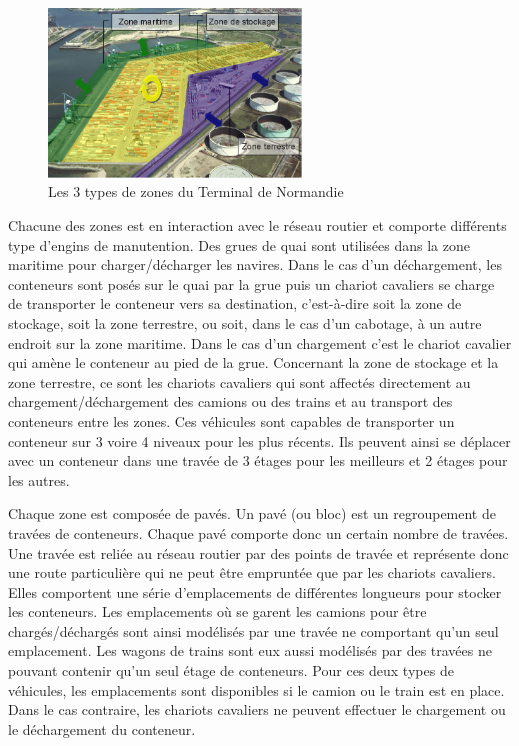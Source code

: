 \begin{figure}[h]
 \centering
 \includegraphics[width=0.6\textwidth]{chapitres/simulation/3zonesDuTN.png}
 \caption{Les 3 types de zones du Terminal de Normandie}
 \label{fig:simulation:3zones}
\end{figure}

Chacune des zones est en interaction avec le réseau routier et comporte différents type d'engins de manutention. Des grues de quai sont utilisées dans la zone maritime pour charger/décharger les navires. Dans le cas d'un déchargement, les conteneurs sont posés sur le quai par la grue puis un chariot cavaliers se charge de transporter le conteneur vers sa destination, c'est-à-dire soit la zone de stockage, soit la zone terrestre, ou soit, dans le cas d'un cabotage, à un autre endroit sur la zone maritime. Dans le cas d'un chargement c'est le chariot cavalier qui amène le conteneur au pied de la grue. Concernant la zone de stockage et la zone terrestre, ce sont les chariots cavaliers qui sont affectés directement au chargement/déchargement des camions ou des trains et au transport des conteneurs entre les zones. Ces véhicules sont capables de transporter un conteneur sur 3 voire 4 niveaux pour les plus récents. Ils peuvent ainsi se déplacer avec un conteneur dans une travée de 3 étages pour les meilleurs et 2 étages pour les autres.

Chaque zone est composée de pavés. Un pavé (ou bloc) est un regroupement de travées de conteneurs. Chaque pavé comporte donc un certain nombre de travées. Une travée est reliée au réseau routier par des points de travée et représente donc une route particulière qui ne peut être empruntée que par les chariots cavaliers. Elles comportent une série d'emplacements de différentes longueurs pour stocker les conteneurs. Les emplacements où se garent les camions pour être chargés/déchargés sont ainsi modélisés par une travée ne comportant qu'un seul emplacement. Les wagons de trains sont eux aussi modélisés par des travées ne pouvant contenir qu'un seul étage de conteneurs. Pour ces deux types de véhicules, les emplacements sont disponibles si le camion ou le train est en place. Dans le cas contraire, les chariots cavaliers ne peuvent effectuer le chargement ou le déchargement du conteneur.

